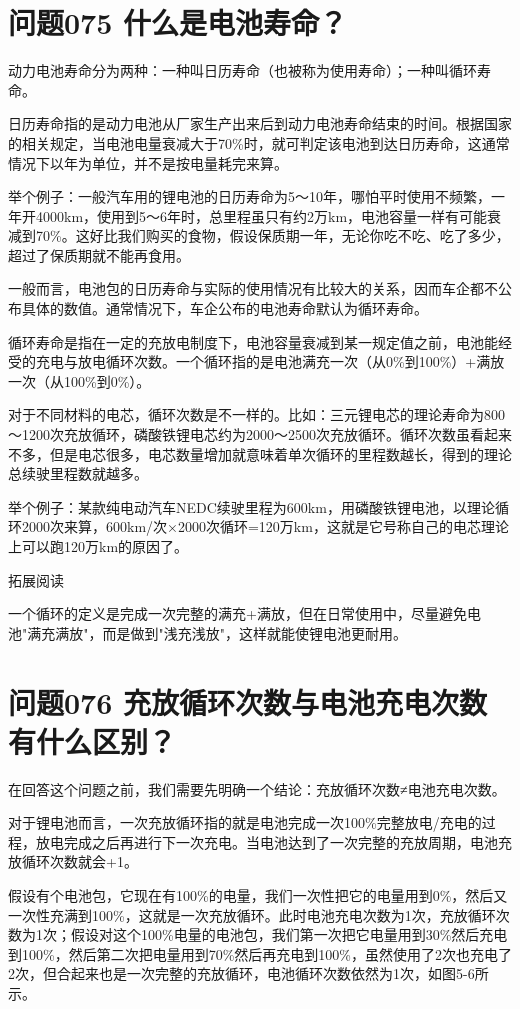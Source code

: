 \documentclass[12pt,UTF8]{ctexbook}
\begin{document}
\section{问题075 什么是电池寿命？}

动力电池寿命分为两种：一种叫日历寿命（也被称为使用寿命）；一种叫循环寿命。

日历寿命指的是动力电池从厂家生产出来后到动力电池寿命结束的时间。根据国家的相关规定，当电池电量衰减大于70\%时，就可判定该电池到达日历寿命，这通常情况下以年为单位，并不是按电量耗完来算。

举个例子：一般汽车用的锂电池的日历寿命为5～10年，哪怕平时使用不频繁，一年开4000km，使用到5～6年时，总里程虽只有约2万km，电池容量一样有可能衰减到70\%。这好比我们购买的食物，假设保质期一年，无论你吃不吃、吃了多少，超过了保质期就不能再食用。

一般而言，电池包的日历寿命与实际的使用情况有比较大的关系，因而车企都不公布具体的数值。通常情况下，车企公布的电池寿命默认为循环寿命。

循环寿命是指在一定的充放电制度下，电池容量衰减到某一规定值之前，电池能经受的充电与放电循环次数。一个循环指的是电池满充一次（从0\%到100\%）+满放一次（从100\%到0\%）。

对于不同材料的电芯，循环次数是不一样的。比如：三元锂电芯的理论寿命为800～1200次充放循环，磷酸铁锂电芯约为2000～2500次充放循环。循环次数虽看起来不多，但是电芯很多，电芯数量增加就意味着单次循环的里程数越长，得到的理论总续驶里程数就越多。

举个例子：某款纯电动汽车NEDC续驶里程为600km，用磷酸铁锂电池，以理论循环2000次来算，600km/次×2000次循环=120万km，这就是它号称自己的电芯理论上可以跑120万km的原因了。

拓展阅读

一个循环的定义是完成一次完整的满充+满放，但在日常使用中，尽量避免电池"满充满放"，而是做到"浅充浅放"，这样就能使锂电池更耐用。

\section{问题076 充放循环次数与电池充电次数有什么区别？}

在回答这个问题之前，我们需要先明确一个结论：充放循环次数≠电池充电次数。

对于锂电池而言，一次充放循环指的就是电池完成一次100\%完整放电/充电的过程，放电完成之后再进行下一次充电。当电池达到了一次完整的充放周期，电池充放循环次数就会+1。

假设有个电池包，它现在有100\%的电量，我们一次性把它的电量用到0\%，然后又一次性充满到100\%，这就是一次充放循环。此时电池充电次数为1次，充放循环次数为1次；假设对这个100\%电量的电池包，我们第一次把它电量用到30\%然后充电到100\%，然后第二次把电量用到70\%然后再充电到100\%，虽然使用了2次也充电了2次，但合起来也是一次完整的充放循环，电池循环次数依然为1次，如图5-6所示。
\end{document}
